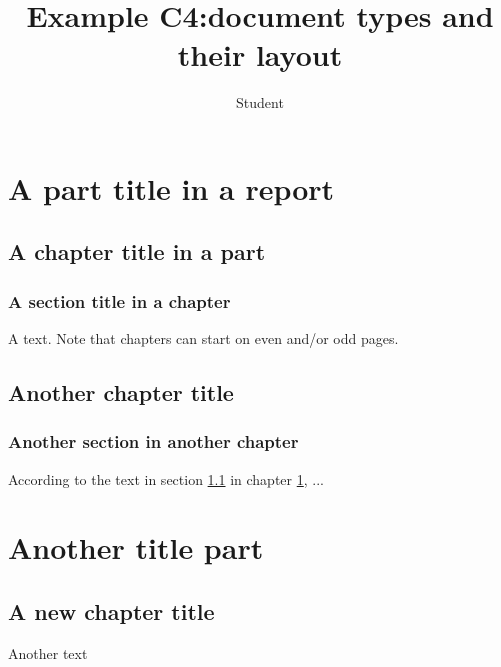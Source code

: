 \documentclass{report}
\title{Example C4:document types and their layout }
\author{Student}
\begin{document}
\maketitle
\tableofcontents
\part{A part title in a report}
\chapter{A chapter title in a part}\label{cha:et}
\section{A section title in a chapter}\label{sec:et}
A text. Note that chapters can start on even and/or odd pages.
\chapter{Another chapter title}
\section{Another section in another chapter}
According to the text in section \ref{sec:et} in chapter \ref{cha:et}, ...
\part{Another title part}
\chapter{A new chapter title}
Another text
\end{document}
